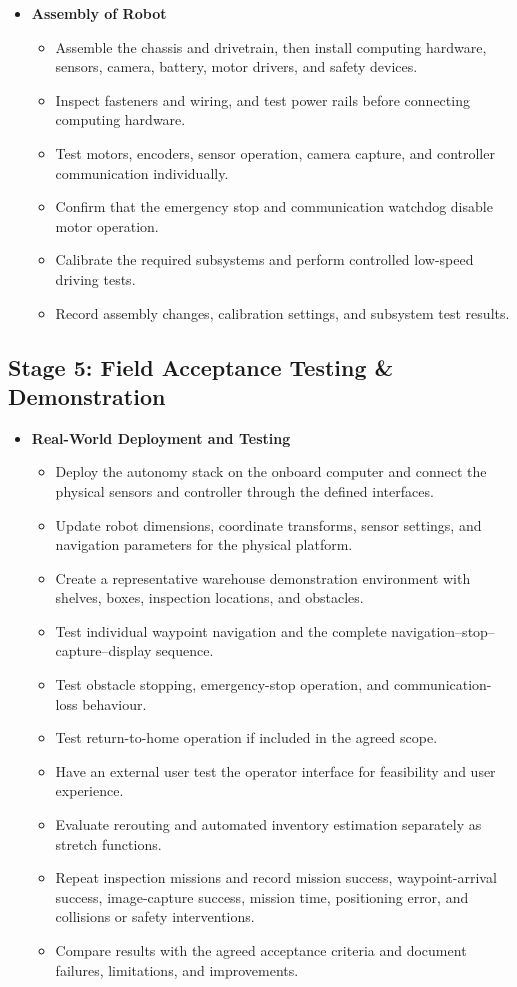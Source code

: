 \documentclass{article}
\begin{document}
\begin{itemize}
	\item \textbf{Assembly of Robot}
	\begin{itemize}
		\item Assemble the chassis and drivetrain, then install computing hardware, sensors, camera, battery, motor drivers, and safety devices.
		\item Inspect fasteners and wiring, and test power rails before connecting computing hardware.
		\item Test motors, encoders, sensor operation, camera capture, and controller communication individually.
		\item Confirm that the emergency stop and communication watchdog disable motor operation.
		\item Calibrate the required subsystems and perform controlled low-speed driving tests.
		\item Record assembly changes, calibration settings, and subsystem test results.
	\end{itemize}
\end{itemize}

\subsection{Stage 5: Field Acceptance Testing \& Demonstration}
\begin{itemize}
	\item \textbf{Real-World Deployment and Testing}
	\begin{itemize}
		\item Deploy the autonomy stack on the onboard computer and connect the physical sensors and controller through the defined interfaces.
		\item Update robot dimensions, coordinate transforms, sensor settings, and navigation parameters for the physical platform.
		\item Create a representative warehouse demonstration environment with shelves, boxes, inspection locations, and obstacles.
		\item Test individual waypoint navigation and the complete navigation--stop--capture--display sequence.
		\item Test obstacle stopping, emergency-stop operation, and communication-loss behaviour.
		\item Test return-to-home operation if included in the agreed scope.
		\item Have an external user test the operator interface for feasibility and user experience.
		\item Evaluate rerouting and automated inventory estimation separately as stretch functions.
		\item Repeat inspection missions and record mission success, waypoint-arrival success, image-capture success, mission time, positioning error, and collisions or safety interventions.
		\item Compare results with the agreed acceptance criteria and document failures, limitations, and improvements.
	\end{itemize}
\end{itemize}
\end{document}
